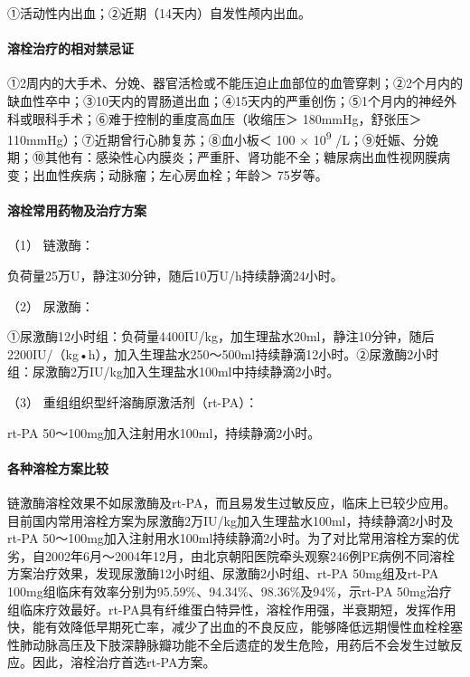 ①活动性内出血；②近期（14天内）自发性颅内出血。

\paragraph{溶栓治疗的相对禁忌证}

①2周内的大手术、分娩、器官活检或不能压迫止血部位的血管穿刺；②2个月内的缺血性卒中；③10天内的胃肠道出血；④15天内的严重创伤；⑤1个月内的神经外科或眼科手术；⑥难于控制的重度高血压（收缩压＞
180mmHg，舒张压＞ 110mmHg）；⑦近期曾行心肺复苏；⑧血小板＜ 100 ×
10\textsuperscript{9}
/L；⑨妊娠、分娩期；⑩其他有：感染性心内膜炎；严重肝、肾功能不全；糖尿病出血性视网膜病变；出血性疾病；动脉瘤；左心房血栓；年龄＞
75岁等。

\paragraph{溶栓常用药物及治疗方案}

\hypertarget{text00278.htmlux5cux23CHP9-8-3-1-2-3-1}{}
（1） 链激酶：

负荷量25万U，静注30分钟，随后10万U/h持续静滴24小时。

\hypertarget{text00278.htmlux5cux23CHP9-8-3-1-2-3-2}{}
（2） 尿激酶：

①尿激酶12小时组：负荷量4400IU/kg，加生理盐水20ml，静注10分钟，随后2200IU/（kg•h），加入生理盐水250～500ml持续静滴12小时。②尿激酶2小时组：尿激酶2万IU/kg加入生理盐水100ml中持续静滴2小时。

\hypertarget{text00278.htmlux5cux23CHP9-8-3-1-2-3-3}{}
（3） 重组组织型纤溶酶原激活剂（rt-PA）：

rt-PA 50～100mg加入注射用水100ml，持续静滴2小时。

\paragraph{各种溶栓方案比较}

链激酶溶栓效果不如尿激酶及rt-PA，而且易发生过敏反应，临床上已较少应用。目前国内常用溶栓方案为尿激酶2万IU/kg加入生理盐水100ml，持续静滴2小时及rt-PA
50～100mg加入注射用水100ml持续静滴2小时。为了对比常用溶栓方案的优劣，自2002年6月～2004年12月，由北京朝阳医院牵头观察246例PE病例不同溶栓方案治疗效果，发现尿激酶12小时组、尿激酶2小时组、rt-PA
50mg组及rt-PA
100mg组临床有效率分别为95.59\%、94.34\%、98.36\%及94\%，示rt-PA
50mg治疗组临床疗效最好。rt-PA具有纤维蛋白特异性，溶栓作用强，半衰期短，发挥作用快，能有效降低早期死亡率，减少了出血的不良反应，能够降低远期慢性血栓栓塞性肺动脉高压及下肢深静脉瓣功能不全后遗症的发生危险，用药后不会发生过敏反应。因此，溶栓治疗首选rt-PA方案。

